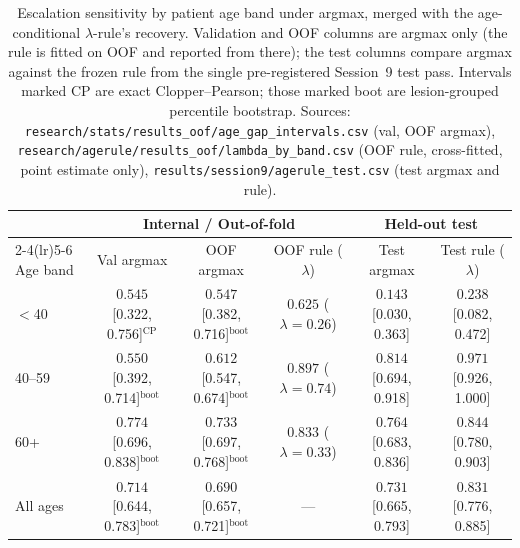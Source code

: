\begin{table}[t]
\centering
\caption{Escalation sensitivity by patient age band under argmax, merged with the age-conditional $\lambda$-rule's recovery. Validation and OOF columns are argmax only (the rule is fitted on OOF and reported from there); the test columns compare argmax against the frozen rule from the single pre-registered Session~9 test pass. Intervals marked CP are exact Clopper--Pearson; those marked boot are lesion-grouped percentile bootstrap. Sources: \texttt{research/stats/results\_oof/age\_gap\_intervals.csv} (val, OOF argmax), \texttt{research/agerule/results\_oof/lambda\_by\_band.csv} (OOF rule, cross-fitted, point estimate only), \texttt{results/session9/agerule\_test.csv} (test argmax and rule).}
\label{tab:agegap_edited}
\footnotesize
\setlength{\tabcolsep}{5pt}
\begin{tabular}{lccccc}
\toprule
 & \multicolumn{3}{c}{Internal / Out-of-fold} & \multicolumn{2}{c}{Held-out test} \\
\cmidrule(lr){2-4}\cmidrule(lr){5-6}
Age band & Val argmax & OOF argmax & OOF rule ($\lambda$) & Test argmax & Test rule ($\lambda$) \\
\midrule
$<$40 & $0.545$ [0.322, 0.756]$^{\text{CP}}$ & $0.547$ [0.382, 0.716]$^{\text{boot}}$ & $0.625$ ($\lambda=0.26$) & $0.143$ [0.030, 0.363] & $0.238$ [0.082, 0.472] \\
40--59 & $0.550$ [0.392, 0.714]$^{\text{boot}}$ & $0.612$ [0.547, 0.674]$^{\text{boot}}$ & $0.897$ ($\lambda=0.74$) & $0.814$ [0.694, 0.918] & $0.971$ [0.926, 1.000] \\
60+ & $0.774$ [0.696, 0.838]$^{\text{boot}}$ & $0.733$ [0.697, 0.768]$^{\text{boot}}$ & $0.833$ ($\lambda=0.33$) & $0.764$ [0.683, 0.836] & $0.844$ [0.780, 0.903] \\
\midrule
All ages & $0.714$ [0.644, 0.783]$^{\text{boot}}$ & $0.690$ [0.657, 0.721]$^{\text{boot}}$ & --- & $0.731$ [0.665, 0.793] & $0.831$ [0.776, 0.885] \\
\bottomrule
\end{tabular}
\end{table}
